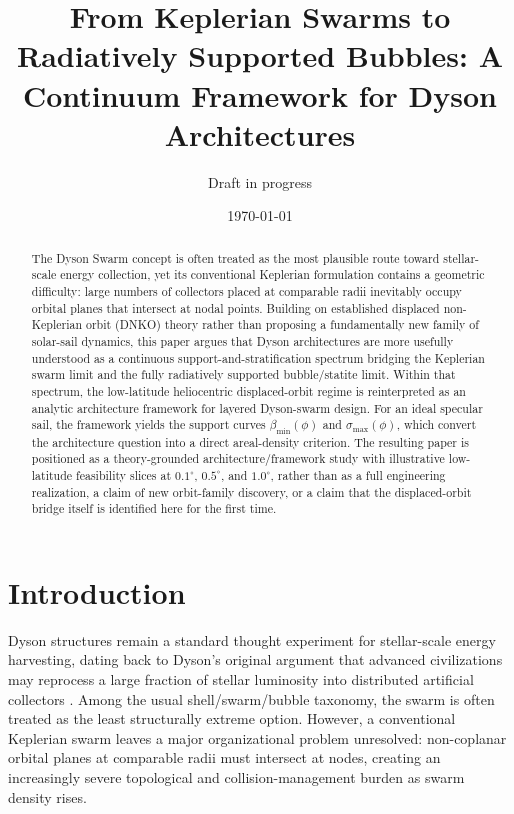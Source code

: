 \documentclass[11pt]{article}
\title{From Keplerian Swarms to Radiatively Supported Bubbles: A Continuum Framework for Dyson Architectures}
\author{Draft in progress}
\date{\today}
\begin{document}
\maketitle

\begin{abstract}
The Dyson Swarm concept is often treated as the most plausible route toward stellar-scale
energy collection, yet its conventional Keplerian formulation contains a geometric
difficulty: large numbers of collectors placed at comparable radii inevitably occupy orbital
planes that intersect at nodal points. Building on established displaced non-Keplerian orbit
(DNKO) theory rather than proposing a fundamentally new family of solar-sail dynamics, this
paper argues that Dyson architectures are more usefully understood as a continuous
support-and-stratification spectrum bridging the Keplerian swarm limit and the fully
radiatively supported bubble/statite limit. Within that spectrum, the low-latitude
heliocentric displaced-orbit regime is reinterpreted as an analytic architecture framework
for layered Dyson-swarm design. For an ideal specular sail, the framework yields the support
curves $\beta_{\min}(\phi)$ and $\sigma_{\max}(\phi)$, which convert the architecture
question into a direct areal-density criterion. The resulting paper is positioned as a
theory-grounded architecture/framework study with illustrative low-latitude feasibility
slices at $0.1^\circ$, $0.5^\circ$, and $1.0^\circ$, rather than as a full engineering
realization, a claim of new orbit-family discovery, or a claim that the displaced-orbit
bridge itself is identified here for the first time.
\end{abstract}

\section{Introduction}

Dyson structures remain a standard thought experiment for stellar-scale energy harvesting,
dating back to Dyson's original argument that advanced civilizations may reprocess a large
fraction of stellar luminosity into distributed artificial collectors \cite{dyson1960infrared}.
Among the usual shell/swarm/bubble taxonomy, the swarm is often treated as the least
structurally extreme option. However, a conventional Keplerian swarm leaves a major
organizational problem unresolved: non-coplanar orbital planes at comparable radii must
intersect at nodes, creating an increasingly severe topological and collision-management
burden as swarm density rises.
\end{document}
